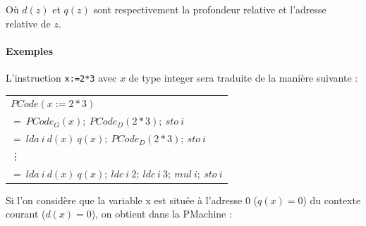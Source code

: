 \documentclass[french,11pt,twoside]{article}
\begin{document}
O\`{u} $d(z)$ et $q(z)$ sont respectivement la profondeur relative et l'adresse relative de $z$.

\paragraph{Exemples} L'instruction \texttt{x:=2*3} avec $x$ de type integer sera traduite de la manière suivante :

\begin{tabular}{l}
$PCode(x:=2*3)$ \\
\hspace{1cm} $=\ PCode_G(x);\ PCode_D(2*3);\ sto\ i $\\
\hspace{1cm} $=\ lda\ i\ d(x)\ q(x);\ PCode_D(2*3);\ sto\ i$\\
\hspace{1cm} \vdots\\
\hspace{1cm} $=\ lda\ i\ d(x)\ q(x);\ ldc\ i\ 2;\ ldc\ i\ 3;\ mul\ i;\ sto\ i $\\
\end{tabular}

Si l'on considère que la variable x est située à l'adresse 0 ($q(x)=0$) du contexte courant ($d(x)=0$), on obtient dans la PMachine :
\end{document}
